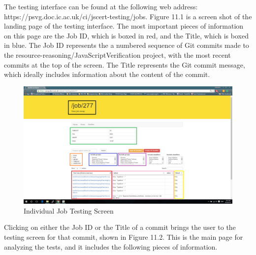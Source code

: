 \documentclass[a4paper,11pt,twoside]{report}
\begin{document}
The testing interface can be found at the following web address: https://psvg.doc.ic.ac.uk/ci/jscert-testing/jobs. Figure 11.1 is a screen shot of the landing page of the testing interface. The most important pieces of information on this page are the Job ID, which is boxed in red, and the Title, which is boxed in blue. The Job ID represents the a numbered sequence of Git commits made to the resource-reasoning/JavaScriptVerification project, with the most recent commits at the top of the screen. The Title represents the Git commit message, which ideally includes information about the content of the commit.

\begin{figure}[h!]
  \caption{Individual Job Testing Screen}
  \includegraphics[width=1.0\textwidth]{job_testing_screen_boxed}
\end{figure}

Clicking on either the Job ID or the Title of a commit brings the user to the testing screen for that commit, shown in Figure 11.2. This is the main page for analyzing the tests, and it includes the following pieces of information.
\end{document}
